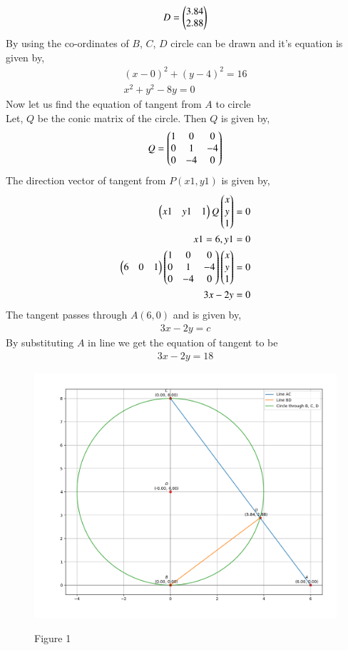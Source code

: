 \documentclass[journal]{IEEEtran}
\begin{document}
\begin{align}
    D=\begin{pmatrix}3.84\\2.88\end{pmatrix}
\end{align}
By using the co-ordinates of $B$, $C$, $D$ circle can be drawn and it's equation is given by,
\begin{align}
    (x-0)^{2}+(y-4)^{2}=16 \\
    x^2+y^2-8y=0
\end{align}
Now let us find the equation of tangent from $A$ to circle \\
Let, $Q$ be the conic matrix of the circle. Then $Q$ is given by,
\begin{align}
    Q=\begin{pmatrix}1&0&0\\0&1&-4\\0&-4&0\end{pmatrix}
\end{align}
The direction vector of tangent from $P(x1,y1)$ is given by,
\begin{align}
    \begin{pmatrix}x1&y1&1\end{pmatrix}Q\begin{pmatrix}x\\y\\1\end{pmatrix} =0\\
    x1=6,y1=0\\
    \begin{pmatrix}6&0&1\end{pmatrix}\begin{pmatrix}1&0&0\\0&1&-4\\0&-4&0\end{pmatrix}\begin{pmatrix}x\\y\\1\end{pmatrix} =0\\
    3x-2y=0
\end{align}
The tangent passes through $A(6,0)$ and is given by,
\begin{align}
    3x-2y=c
\end{align}
By substituting $A$ in line we get the equation of tangent to be 
\begin{align}
    3x-2y=18
\end{align}
\begin{figure}[h!]
   \centering
   \includegraphics[width=0.7\linewidth]{figs/figure_1.png}
   \label{stemplot}
   \caption{Figure 1}
\end{figure}
\end{document}
